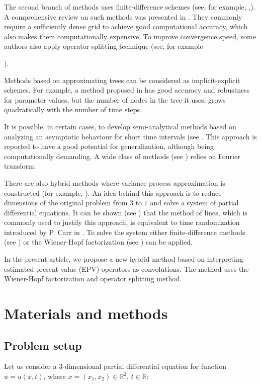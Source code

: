 \documentclass[a4paper]{jpconf}
\begin{document}
The second branch of methods uses finite-difference schemes (see, for example, \cite{chiarella},\cite{zvan}). A comprehensive review on such methods was presented in \cite{zanette_heston}. They commonly require a sufficiently dense grid to achieve good computational accuracy, which also makes them computationally expensive. To improve convergence speed, some authors also apply operator splitting technique (see, for example {\cite{ikonen-toivanen, itkin}).

Methods based on approximating trees can be considered as implicit-explicit schemes. For example, a method proposed in \cite{vellekoop_nie} has good accuracy and robustness for parameter values, but the number of nodes in the tree it uses, grows quadratically with the number of time steps. 

It is possible, in certain cases, to develop semi-analytical methods based on analyzing an asymptotic behaviour for short time intervals (see \cite{medvedev_scailett}. This approach is reported to have a good potential for generalization, although being computationally demanding. A wide class of methods (see \cite{fang}) relies on Fourier transform.

There are also hybrid methods where variance process approximation is constructed (for example, \cite{zanette_tree, chourdakis}). An idea behind this approach is to reduce dimensions of the original problem from $3$ to $1$ and solve a system of partial differential equations. It can be shown (see \cite{kudr_mex}) that the method of lines, which is commonly used to justify this approach, is equivalent to time randomization introduced by P. Carr in \cite{carr}. To solve the system either finite-difference methods (see \cite{zanette_heston}) or the Wiener-Hopf factorization (see \cite{kudr_mex, kudr_jopcs}) can be applied.

In the present article, we propose a new hybrid method based on interpreting estimated present value (EPV) operators as convolutions. The method uses the Wiener-Hopf factorization and operator splitting method.

\section{Materials and methods}

\subsection{Problem setup}\label{problems-setup}
Let us consider a 3-dimensional partial differential equation for function $u = u(x,t)$, where $x = (x_1,x_2)\in\mathbb{R}^2$, $t\in\mathbb{R}$:

}
\end{document}

